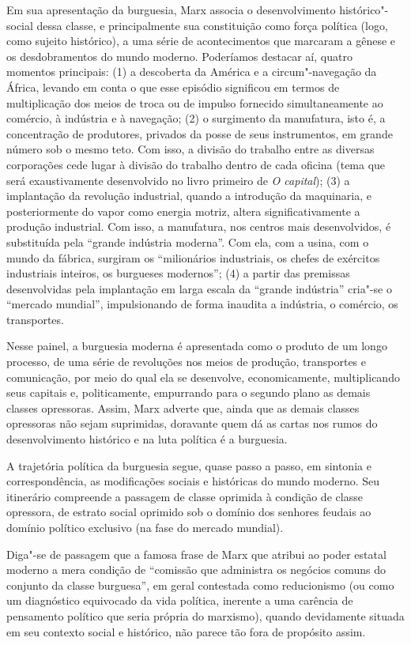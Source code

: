Em sua apresentação da burguesia, Marx associa o desenvolvimento
histórico"-social dessa classe, e principalmente sua constituição como
força política (logo, como sujeito histórico), a uma série de
acontecimentos que marcaram a gênese e os desdobramentos do mundo
moderno. Poderíamos destacar aí, quatro momentos principais: (1) a
descoberta da América e a circum"-navegação da África, levando em conta o
que esse episódio significou em termos de multiplicação dos meios de
troca ou de impulso fornecido simultaneamente ao comércio, à indústria
e à navegação; (2) o surgimento da manufatura, isto é, a concentração
de produtores, privados da posse de seus instrumentos, em grande número
sob o mesmo teto. Com isso, a divisão do trabalho entre as diversas
corporações cede lugar à divisão do trabalho dentro de cada oficina
(tema que será exaustivamente desenvolvido no livro primeiro de
\textit{O capital}); (3) a implantação da revolução industrial, quando
a introdução da maquinaria, e posteriormente do vapor como energia
motriz, altera significativamente a produção industrial. Com isso, a
manufatura, nos centros mais desenvolvidos, é substituída pela “grande
indústria moderna”. Com ela, com a usina, com o mundo da fábrica,
surgiram os “milionários industriais, os chefes de exércitos
industriais inteiros, os burgueses modernos”; (4) a partir das
premissas desenvolvidas pela implantação em larga escala da “grande
indústria” cria"-se o “mercado mundial”, impulsionando de forma
inaudita a indústria, o comércio, os transportes.

Nesse painel, a burguesia moderna é apresentada como o produto de um
longo processo, de uma série de revoluções nos meios de produção,
transportes e comunicação, por meio do qual ela se desenvolve,
economicamente, multiplicando seus capitais e, politicamente,
empurrando para o segundo plano as demais classes opressoras. Assim,
Marx adverte que, ainda que as demais classes opressoras não sejam
suprimidas, doravante quem dá as cartas nos rumos do desenvolvimento
histórico e na luta política é a burguesia.

A trajetória política da burguesia segue, quase passo a passo, em
sintonia e correspondência, as modificações sociais e históricas do
mundo moderno. Seu itinerário compreende a passagem de classe oprimida
à condição de classe opressora, de estrato social oprimido sob o
domínio dos senhores feudais ao domínio político exclusivo (na fase do
mercado mundial).

Diga"-se de passagem que a famosa frase de Marx que atribui ao poder
estatal moderno a mera condição de “comissão que administra os negócios
comuns do conjunto da classe burguesa”, em geral contestada como
reducionismo (ou como um diagnóstico equivocado da vida política,
inerente a uma carência de pensamento político que seria própria do
marxismo), quando devidamente situada em seu contexto social e
histórico, não parece tão fora de propósito assim.

